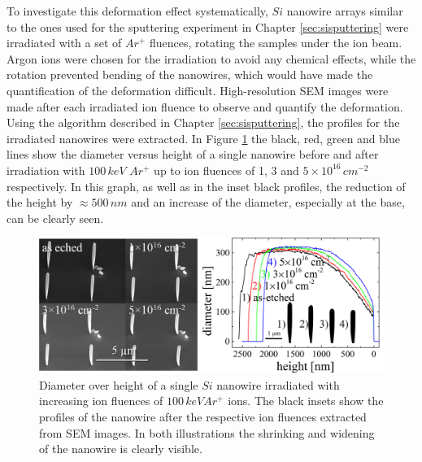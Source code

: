 To investigate this deformation effect systematically, $Si$ nanowire arrays similar to the ones used for the sputtering experiment in Chapter \ref{sec:sisputtering} were irradiated with a set of $Ar^+$ fluences, rotating the samples under the ion beam. Argon ions were chosen for the irradiation to avoid any chemical effects, while the rotation prevented bending of the nanowires, which would have made the quantification of the deformation difficult.  High-resolution SEM images were made after each irradiated ion fluence to observe and quantify the deformation. Using the algorithm described in Chapter \ref{sec:sisputtering}, the profiles for the irradiated nanowires were extracted. In Figure \ref{deformationprofile} the black, red, green and blue lines show the diameter versus height of a single nanowire before and after irradiation with $100\,keV\,\,Ar^+$ up to ion fluences of 1, 3 and $5 \times 10^{16}\,cm^{-2}$ respectively. In this graph, as well as in the inset black profiles, the reduction of the height by $\approx 500\,nm$ and an increase of the diameter, especially at the base, can be clearly seen. 


\begin{figure}[thbp]
	\centering
		\includegraphics[width=.99\textwidth]{images/deformationprofileandSEM.jpg}
		\caption{Diameter over height of a single $Si$ nanowire irradiated with increasing ion fluences of $100\,keV Ar^+$ ions. The black insets show the profiles of the nanowire after the respective ion fluences extracted from SEM images. In both illustrations the shrinking and widening of the nanowire is clearly visible.} 
	\label{deformationprofile} 
\end{figure}

